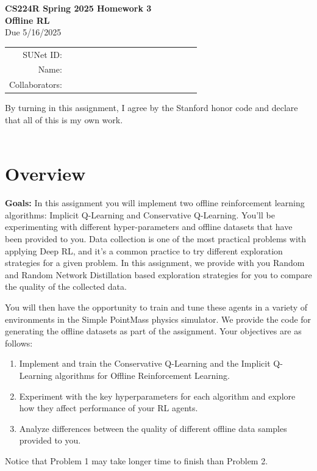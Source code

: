 \documentclass[12pt]{article}
\begin{document}
\begin{center}
{\Large \textbf{CS224R Spring 2025 Homework 3 \\ Offline RL}}
\\ {\large Due 5/16/2025}

\begin{tabular}{rl}
SUNet ID: & $\hspace{6cm}$\\
Name: & \\
Collaborators: & 
\end{tabular}
\end{center}

\noindent By turning in this assignment, I agree by the Stanford honor code and declare
that all of this is my own work. \\
\\

\section*{Overview}

\textbf{Goals:} In this assignment you will implement two offline reinforcement learning algorithms: Implicit Q-Learning and Conservative Q-Learning. You'll be experimenting with different hyper-parameters and offline datasets that have been provided to you. Data collection is one of the most practical problems with applying Deep RL, and it's a common practice to try different exploration strategies for a given problem. In this assignment, we provide with you Random and Random Network Distillation based exploration strategies for you to compare the quality of the collected data.


You will then have the opportunity to train and tune these agents in a variety of environments in the Simple PointMass physics simulator. We provide the code for generating the offline datasets as part of the assignment. Your objectives are as follows:

\begin{enumerate} 
    \item Implement and train the Conservative Q-Learning and the Implicit Q-Learning algorithms for Offline Reinforcement Learning.
    \item Experiment with the key hyperparameters for each algorithm and explore how they affect performance of your RL agents.
    \item Analyze differences between the quality of different offline data samples provided to you. 
\end{enumerate}
Notice that Problem 1 may take longer time to finish than Problem 2.
\end{document}
